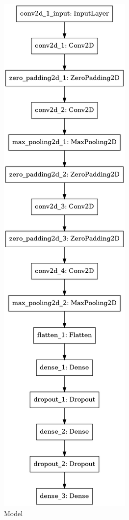 \documentclass[12pt]{report}
\begin{document}
\begin{figure}
    \centering
    \includegraphics[scale = 0.4]{fig4.png}
    \caption{Model}
\end{figure}
\newpage
\end{document}
